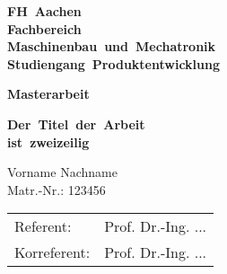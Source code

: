 \documentclass[12pt,a4paper]{scrreprt}
\author{Sven Hinz} %
\begin{document}

\begin{titlepage}

	\thispagestyle{empty}



	\centering \bfseries \Large FH~Aachen \\
	\vspace{0.5cm}
	\normalsize Fachbereich\\
	Maschinenbau~und~Mechatronik \\
	Studiengang~Produktentwicklung

	\vspace{1cm}

	\centering \bfseries Masterarbeit

	\vspace{0.8cm}

	\centering \begin{minipage}[t]{17cm}
		\centering \bfseries \large Der~Titel~der~Arbeit\\ ist~zweizeilig
		\medskip
	\end{minipage}

	\vspace{1.5cm}

	\begin{minipage}[t]{9cm}
		\centering Vorname Nachname \\ Matr.-Nr.: 123456
	\end{minipage}

	\vspace{2.1cm}

	\centering \begin{minipage}[t]{9cm}
		\centering \begin{tabular}{ll}
			Referent: & Prof. Dr.-Ing. ...\\
			Korreferent: & Prof. Dr.-Ing. ...\\
		\end{tabular}
	\end{minipage}


\end{titlepage}
\end{document}

